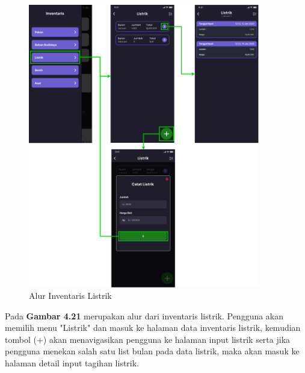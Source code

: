 \begin{spacing}{1.5}
	\begin{figure}[H]
		\centering
		\includegraphics[width=0.9\textwidth]{gambar/sprint2/flow_electric.png}
		\caption{Alur Inventaris Listrik}
	\end{figure}

	Pada \textbf{Gambar 4.21} merupakan alur dari inventaris listrik. Pengguna akan memilih menu "Listrik" dan masuk ke halaman data inventaris listrik, kemudian tombol (+) akan menavigasikan pengguna ke halaman input listrik serta jika pengguna menekan salah satu list bulan pada data listrik, maka akan masuk ke halaman detail input tagihan listrik.


\end{spacing}
